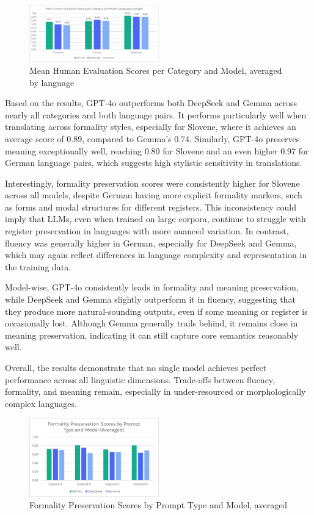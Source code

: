 \documentclass[fleqn,moreauthors,10pt]{ds_report}
\begin{document}
	\begin{figure}[h]
	\centering
	\includegraphics[width=0.5\textwidth]{image3.png}
	\caption{Mean Human Evaluation Scores per Category and Model, averaged by language}		
	\label{Figure 3}
\end{figure}

Based on the results, GPT-4o outperforms both DeepSeek and Gemma across nearly all categories and both language pairs. It performs particularly well when translating across formality styles, especially for Slovene, where it achieves an average score of 0.89, compared to Gemma’s 0.74. Similarly, GPT-4o preserves meaning exceptionally well, reaching 0.80 for Slovene and an even higher 0.97 for German language pairs, which suggests high stylistic sensitivity in translations.

Interestingly, formality preservation scores were consistently higher for Slovene across all models, despite German having more explicit formality markers, such as forms and modal structures for different registers. This inconsistency could imply that LLMs, even when trained on large corpora, continue to struggle with register preservation in languages with more nuanced variation. In contrast, fluency was generally higher in German, especially for DeepSeek and Gemma, which may again reflect differences in language complexity and representation in the training data. 

Model-wise, GPT-4o consistently leads in formality and meaning preservation, while DeepSeek and Gemma slightly outperform it in fluency, suggesting that they produce more natural-sounding outputs, even if some meaning or register is occasionally lost. Although Gemma generally trails behind, it remains close in meaning preservation, indicating it can still capture core semantics reasonably well. 

Overall, the results demonstrate that no single model achieves perfect performance across all linguistic dimensions. Trade-offs between fluency, formality, and meaning remain, especially in under-resourced or morphologically complex languages.

\begin{figure}[h]
	\centering
	\includegraphics[width=0.5\textwidth]{image4.png}
	\caption{Formality Preservation Scores by Prompt Type and Model, averaged}		
	\label{Figure 4}
\end{figure}
\end{document}
